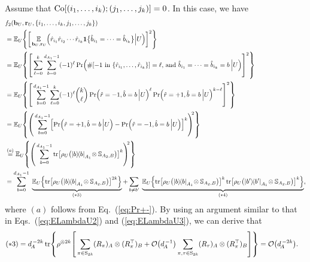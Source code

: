 \documentclass[aps,prl,twocolumn,nofootinbib,superscriptaddress,10pt]{revtex4-2}
\let\originalleft\left
\let\originalright\right
\renewcommand{\left}{\mathopen{}\mathclose\bgroup\originalleft}
\renewcommand{\right}{\aftergroup\egroup\originalright}
\def\E{ {\mathbb E} } %
\newcommand{\ketbra}[2]{\ensuremath{\left|#1\right\rangle\!\left\langle#2\right|}}
\DeclareMathOperator{\Tr}{tr}
\newcommand{\bigo}[1]{\mathcal{O}\left(#1\right)}
\theoremstyle{plain}
\theoremstyle{definition}
\def\eqref#1{\textup{(\ref{#1})}}
\newcommand{\eref}[1]{Eq.~\textup{(\ref{#1})}}
\begin{document}
Assume that ${\rm Co}[(i_1,\dots,i_k);(j_1,\dots,j_k)]=0$. In this case, we have
\begin{align}\label{eq:PTVariance7} 
&f_2\left( \mathbf{b}_{U},\mathbf{r}_{U},\left\lbrace i_1,\dots,i_k,j_1,\dots,j_k\right\rbrace \right)
\nonumber\\
&=\E_{U} \left\lbrace \left[ \underset{\,\mathbf{b}_{U},\mathbf{r}_{U}}{\E}  \left( \hat{r}_{i_1}\hat{r}_{i_2}\cdots \hat{r}_{i_k}  \textbf{1}\big\{\hat{b}_{i_1}=\dots=\hat{b}_{i_k}\big\} \Big| U \right) \right]^2 \right\rbrace 
\nonumber \\
&= \E_{U} \left\lbrace \left[ \, 
\sum_{\ell=0}^{k} \sum_{b=0}^{d_{A_1}-1} (-1)^{\ell} 
\Pr\left(
\#\left[ \text{$-1$ in $\left\lbrace \hat{r}_{i_1},\dots, \hat{r}_{i_k}\right\rbrace $}\right] =\ell,\,\text{and }
\hat{b}_{i_1}=\dots=\hat{b}_{i_k}=b \,\Big| U \right) \right]^2  \right\rbrace 
\nonumber \\
&= \E_{U} \left\lbrace \left[ \,
\sum_{b=0}^{d_{A_1}-1} \sum_{\ell=0}^{k}  (-1)^{\ell}  
\binom{k}{\ell} 
\Pr\left(\hat{r}=-1, \hat{b}=b \,\Big| U\right)^{\ell}
\Pr\left(\hat{r}=+1, \hat{b}=b \,\Big| U\right)^{k-\ell} 
\right]^2 \right\}
\nonumber \\
&= \E_{U} \left\lbrace \left( \,
\sum_{b=0}^{d_{A_1}-1} 
\left[ \Pr\left(\hat{r}=+1, \hat{b}=b \,\Big| U\right)-
\Pr\left(\hat{r}=-1, \hat{b}=b \,\Big| U\right) \right]^k 
\right)^{\!\!2} \right\}
\nonumber \\
&\stackrel{(a)}{=} \E_{U} \left\lbrace \left( \, \sum_{b=0}^{d_{A_1}-1}
\Tr\left[\rho_{U} \left( \ketbra{b}{b}_{A_1} \!\otimes \mathbb{S}_{A_2,B} \right) \right]^{k}
\right)^{\!\!2} \right\rbrace
\nonumber \\
&= \sum_{b=0}^{d_{A_1}-1}\;
\underbrace{ \E_{U} \left\lbrace 
\Tr\left[\rho_{U} \left( \ketbra{b}{b}_{A_1} \!\otimes \mathbb{S}_{A_2,B} \right) \right]^{2k}
\right\rbrace }_{(*3)}
+ \sum_{b\ne b'}\;
\underbrace{ \E_{U} \left\lbrace 
\Tr\left[\rho_{U} \left( \ketbra{b}{b}_{A_1} \!\otimes \mathbb{S}_{A_2,B} \right)  \right]^{k}
\Tr\left[\rho_{U} \left( \ketbra{b'}{b'}_{A_1} \!\otimes \mathbb{S}_{A_2,B} \right) \right]^{k}
\right\rbrace}_{(*4)},
\end{align}
where $(a)$ follows from \eref{eq:Pr+-}. 
By using an argument similar to that in Eqs.~\eqref{eq:ELambdaU2} and \eqref{eq:ELambdaU3}, we can derive that
\begin{align}\label{eq:PTVariance8} 
(*3)&= d_{\!A}^{\,-2k}
\Tr\left\lbrace \rho^{\otimes 2k} \left[\, \sum_{\pi\in \mathrm{S}_{2k}} (R_\pi)_A \otimes (R_\pi^\top)_B 
+ \bigo{d_{\!A}^{\,-1}} \sum_{\pi, \tau \in \mathrm{S}_{2k}} 
(R_\tau)_{A} \otimes (R_\pi^\top)_B \right] \right\rbrace 
= \bigo{d_{\!A}^{\,-2k}}. 
\end{align}
\end{document}
